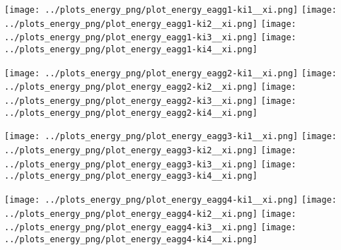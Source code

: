 \begin{minipage}{0.25\textwidth} 
 \texttt{[image: ../plots\_energy\_png/plot\_energy\_eagg1-ki1\_\_xi.png]}
\texttt{[image: ../plots\_energy\_png/plot\_energy\_eagg1-ki2\_\_xi.png]}
\texttt{[image: ../plots\_energy\_png/plot\_energy\_eagg1-ki3\_\_xi.png]}
\texttt{[image: ../plots\_energy\_png/plot\_energy\_eagg1-ki4\_\_xi.png]}
\end{minipage}%
\begin{minipage}{0.25\textwidth} 
 \texttt{[image: ../plots\_energy\_png/plot\_energy\_eagg2-ki1\_\_xi.png]}
\texttt{[image: ../plots\_energy\_png/plot\_energy\_eagg2-ki2\_\_xi.png]}
\texttt{[image: ../plots\_energy\_png/plot\_energy\_eagg2-ki3\_\_xi.png]}
\texttt{[image: ../plots\_energy\_png/plot\_energy\_eagg2-ki4\_\_xi.png]}
\end{minipage}%
\begin{minipage}{0.25\textwidth} 
 \texttt{[image: ../plots\_energy\_png/plot\_energy\_eagg3-ki1\_\_xi.png]}
\texttt{[image: ../plots\_energy\_png/plot\_energy\_eagg3-ki2\_\_xi.png]}
\texttt{[image: ../plots\_energy\_png/plot\_energy\_eagg3-ki3\_\_xi.png]}
\texttt{[image: ../plots\_energy\_png/plot\_energy\_eagg3-ki4\_\_xi.png]}
\end{minipage}%
\begin{minipage}{0.25\textwidth} 
 \texttt{[image: ../plots\_energy\_png/plot\_energy\_eagg4-ki1\_\_xi.png]}
\texttt{[image: ../plots\_energy\_png/plot\_energy\_eagg4-ki2\_\_xi.png]}
\texttt{[image: ../plots\_energy\_png/plot\_energy\_eagg4-ki3\_\_xi.png]}
\texttt{[image: ../plots\_energy\_png/plot\_energy\_eagg4-ki4\_\_xi.png]}
\end{minipage}%
